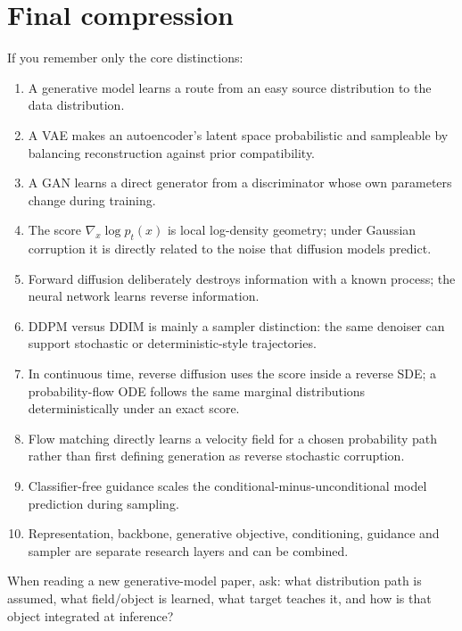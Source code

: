 \section{Final compression}

If you remember only the core distinctions:
\begin{enumerate}
    \item A generative model learns a route from an easy source distribution to the data distribution.
    \item A VAE makes an autoencoder's latent space probabilistic and sampleable by balancing reconstruction against prior compatibility.
    \item A GAN learns a direct generator from a discriminator whose own parameters change during training.
    \item The score $\nabla_x\log p_t(x)$ is local log-density geometry; under Gaussian corruption it is directly related to the noise that diffusion models predict.
    \item Forward diffusion deliberately destroys information with a known process; the neural network learns reverse information.
    \item DDPM versus DDIM is mainly a sampler distinction: the same denoiser can support stochastic or deterministic-style trajectories.
    \item In continuous time, reverse diffusion uses the score inside a reverse SDE; a probability-flow ODE follows the same marginal distributions deterministically under an exact score.
    \item Flow matching directly learns a velocity field for a chosen probability path rather than first defining generation as reverse stochastic corruption.
    \item Classifier-free guidance scales the conditional-minus-unconditional model prediction during sampling.
    \item Representation, backbone, generative objective, conditioning, guidance and sampler are separate research layers and can be combined.
\end{enumerate}

\begin{calloutmemoryhook}
When reading a new generative-model paper, ask: what distribution path is assumed, what field/object is learned, what target teaches it, and how is that object integrated at inference?
\end{calloutmemoryhook}